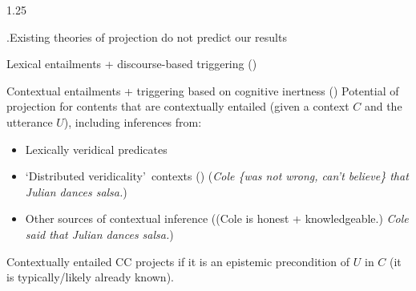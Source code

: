 \documentclass[final, table, cmyk]{beamer}
\newlength{\colwidth}
\begin{document}
\begin{frame}[t]
\begin{columns}[t]
\begin{column}{1.25\colwidth}
\begin{normalbox}{\phantom.\hfill Existing theories of projection do not predict our results}
\begin{theorybox}{Lexical entailments + discourse-based triggering \hfill (\citealt{abrusan_predicting_2011,simons_best_2017})}
				\end{theorybox}

				\begin{theorybox}{Contextual entailments + triggering based on cognitive inertness \hfill (\citealt{schlenker_triggering_2021})}
					\small Potential of projection for contents that are contextually entailed (given a context $C$ and the utterance $U$), including inferences from:
					\vspace{-.3\baselineskip}
					\begin{itemize}
						\item Lexically veridical predicates
						\item \lq Distributed veridicality\rq\ contexts (\citealt{roberts_i_2019}) \hfill (\textit{Cole \{was not wrong, can’t believe\} that Julian dances salsa.})
						\item Other sources of contextual inference \hfill ((Cole is honest + knowledgeable.) \textit{Cole said that Julian dances salsa.})
					\end{itemize}
					\vspace{-.2\baselineskip}
					Contextually entailed CC projects if it is an epistemic precondition of $U$ in $C$ (it is typically/likely already known).

				\end{theorybox}


\end{normalbox}
\end{column}
\end{columns}
\end{frame}
\end{document}
